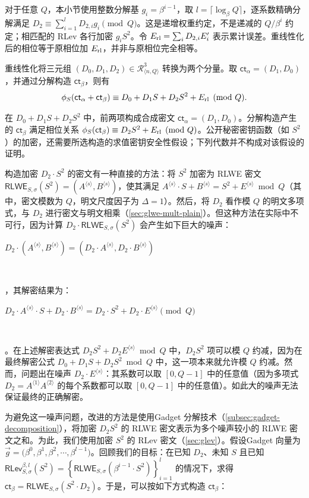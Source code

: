 对于任意 $Q$，本小节使用整数分解基 $g_i=\beta^{i-1}$，取 $l=\lceil\log_\beta Q\rceil$，逐系数精确分解满足 $D_2\equiv\sum_{i=1}^lD_{2,i}g_i\pmod Q$。这是递增权重约定，不是递减的 $Q/\beta^i$ 约定；相匹配的 RLev 各行加密 $g_iS^2$。令 $E_{\rm rl}=\sum_iD_{2,i}E_i'$ 表示累计误差。重线性化后的相位等于原相位加 $E_{\rm rl}$，并非与原相位完全相等。

重线性化将三元组 $(D_0,D_1,D_2)\in\mathcal R_{\langle n,Q\rangle}^3$ 转换为两个分量。取 $\textsf{ct}_\alpha=(D_1,D_0)$，并通过分解构造 $\textsf{ct}_\beta$，则有
\[
\phi_S(\textsf{ct}_\alpha+\textsf{ct}_\beta)\equiv D_0+D_1S+D_2S^2+E_{\rm rl}\pmod Q.
\]

在 $D_0+D_1S+D_2S^2$ 中，前两项构成合成密文 $\textsf{ct}_\alpha=(D_1,D_0)$。分解构造产生的 $\textsf{ct}_\beta$ 满足相位关系 $\phi_S(\textsf{ct}_\beta)\equiv D_2S^2+E_{\rm rl}\pmod Q$。公开秘密密钥函数（如 $S^2$）的加密，还需要所选构造的求值密钥安全性假设；下列代数并不构成对该假设的证明。

构造加密 $D_2 \cdot S^2$ 的密文有一种直接的方法：将 $S^2$ 加密为 RLWE 密文 $\textsf{RLWE}_{S, \sigma}(S^2) = (A^{\langle s \rangle}, B^{\langle s \rangle})$，使其满足 $A^{\langle s \rangle}\cdot S + B^{\langle s \rangle} = S^2 + E^{\langle s \rangle} \bmod Q$（其中，密文模数为 $Q$，明文尺度因子为 $\Delta = 1$）。然后，将 $D_2$ 看作模 $Q$ 的明文多项式，与 $D_2$ 进行密文与明文相乘（\autoref{sec:glwe-mult-plain}）。但这种方法在实际中不可行，因为计算 $D_2 \cdot \textsf{RLWE}_{S, \sigma}(S^2)$ 会产生如下巨大的噪声：

$D_2 \cdot (A^{\langle s \rangle}, B^{\langle s \rangle}) = (D_2\cdot A^{\langle s \rangle}, D_2 \cdot B^{\langle s \rangle})$

$ $

，其解密结果为：

$D_2\cdot A^{\langle s \rangle} \cdot S + D_2\cdot B^{\langle s \rangle} = D_2 \cdot S^2 + D_2\cdot E^{\langle s \rangle} \pmod Q$ 

$ $

。在上述解密表达式 $D_2S^2 + D_2E^{\langle s \rangle} \bmod Q$ 中，$D_2S^2$ 项可以模 $Q$ 约减，因为在最终解密公式 $D_0 + D_1S + D_2S^2 \bmod Q$ 中，这一项本来就允许模 $Q$ 约减。然而，问题出在噪声 $D_2\cdot E^{\langle s \rangle}$：其系数可以取 $[0, Q - 1]$ 中的任意值（因为多项式 $D_2 = A^{\langle 1 \rangle} A^{\langle 2 \rangle}$ 的每个系数都可以取 $[0, Q - 1]$ 中的任意值）。如此大的噪声无法保证最终的正确解密。

为避免这一噪声问题，改进的方法是使用Gadget 分解技术（\autoref{subsec:gadget-decomposition}），将加密 $D_2 S^2$ 的 RLWE 密文表示为多个噪声较小的 RLWE 密文之和。为此，我们使用加密 $S^2$ 的 RLev 密文（\autoref{sec:glev}）。假设Gadget 向量为 $\vec{g} = \Bigg(\beta^{0}, \beta^{1}, \beta^{2}, \cdots, \beta^{l-1}\Bigg)$。回顾我们的目标：在已知 $D_2$、未知 $S$ 且已知 $\textsf{RLev}_{S, \sigma}^{\beta, l}(S^2) = \left\{\textsf{RLWE}_{S, \sigma}\left(\beta^{i-1}\cdot S^2\right)\right\}_{i=1}^{l}$ 的情况下，求得 $\textsf{ct}_\beta = \textsf{RLWE}_{S, \sigma}( S^2 \cdot D_2)$。于是，可以按如下方式构造 $\textsf{ct}_\beta$：

